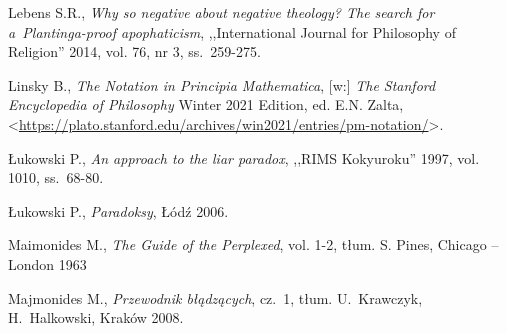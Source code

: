 \begin{thebibliography}{100}
Lebens S.R., \textit{Why so negative about negative theology? The search for a~Plantinga-proof apophaticism},
,,International Journal for Philosophy of Religion'' 2014, vol. 76, nr 3, ss.~259-275.




Linsky B., \textit{The Notation in Principia Mathematica}, [w:] \textit{The Stanford Encyclopedia of Philosophy}
Winter 2021 Edition, ed. E.N. Zalta, <\url{https://plato.stanford.edu/archives/win2021/entries/pm-notation/}>.


Łukowski P., \textit{An approach to the liar paradox}, ,,RIMS Kokyuroku'' 1997, vol. 1010, ss.~68-80.

Łukowski P., \textit{Paradoksy}, Łódź 2006.

Maimonides M., \textit{The Guide of the Perplexed}, vol. 1-2, tłum. S. Pines, Chicago -- London 1963


Majmonides  M., \textit{Przewodnik błądzących}, cz.~1, tłum. U.~Krawczyk, H.~Halkowski, Kraków 2008.



\end{thebibliography}
